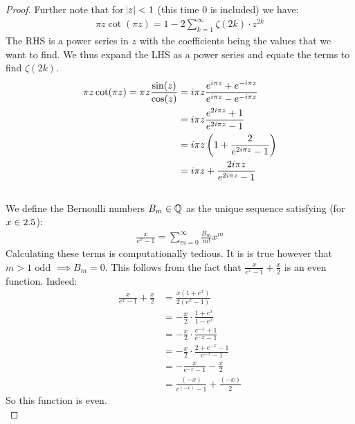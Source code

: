 \begin{proof}
Further note that for $\abs{z} < 1$ (this time $0$ is included) we have:
\begin{align*}
    \pi z \cot(\pi z) = 1 - 2 \sum_{k=1}^\infty \zeta(2k) \cdot z^{2k}
\end{align*}
The RHS is a power series in $z$ with the coefficients being the values that we want to find. We thus expand the LHS as a power series and equate the terms to find $\zeta(2k)$.
\begin{align*}
    \pi z \cot(\pi z) = \pi z \frac{\sin(z)}{\cos(z)} &= i \pi z \frac{e^{i \pi z} + e^{-i \pi z}}{e^{i \pi z} - e^{-i \pi z}}\\
    & = i \pi z \frac{e^{2 i \pi z} + 1}{e^{2 i \pi z} - 1}\\
    &= i \pi z \left(  1 + \frac{2}{e^{2 i \pi z} - 1}  \right)\\
    &= i \pi z + \frac{2i \pi z}{e^{2 i \pi z} - 1}
\end{align*}\\
We define the Bernoulli numbers $B_m \in \mathbb{Q}$ as the unique sequence satisfying (for $x \in 2.5$):
\begin{align*}
    \frac{x}{e^x - 1} = \sum_{m=0}^\infty \frac{B_m}{m!} x^m
\end{align*}
Calculating these terms is computationally tedious. It is is true however that $m>1 \text{ odd } \implies B_m = 0$. This follows from the fact that $\frac{x}{e^x - 1} + \frac{x}{2}$ is an even function. Indeed:
\begin{align*}\frac{x}{e^x - 1} + \frac{x}{2} &= \frac{x(1+e^x)}{2(e^x-1)} \\&= - \frac{x}{2} \cdot \frac{1+e^x}{1-e^x}\\
&= - \frac{x}{2} \cdot \frac{e^{-x} + 1}{e^{-x} - 1}\\
&= - \frac{x}{2} \cdot \frac{2+e^{-x} -1}{e^{-x} - 1}\\
&= - \frac{x}{e^{-x}-1} - \frac{x}{2}\\
&=  \frac{(-x)}{e^{(-x)}-1} + \frac{(-x)}{2}
\end{align*}
So this function is even.\\


\end{proof}
